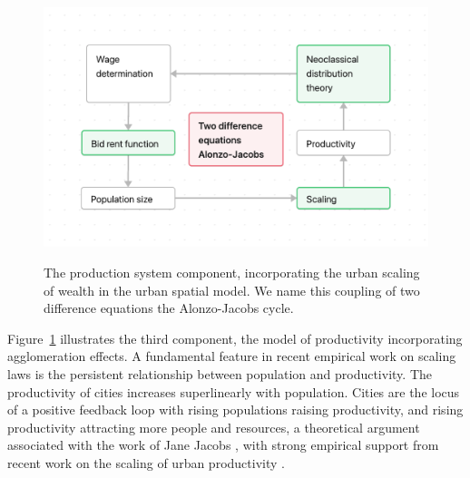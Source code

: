 \begin{figure}[!ht]
    \centering
    \includegraphics[scale=.7]{fig/flow_alonzo-jacobs_cycle.png}
    \label{fig-alonzo-jacobs-cycle}
\caption[Production system.]{The production system component, incorporating the urban scaling of wealth in the urban spatial model. We name this coupling of two difference equations the Alonzo-Jacobs cycle.}
\end{figure}

Figure~\ref{fig-alonzo-jacobs-cycle} illustrates the third component, the model of productivity incorporating agglomeration effects. A fundamental feature in recent empirical work on scaling laws is the persistent relationship between population and productivity. The productivity of cities increases superlinearly with population. Cities are the locus of a positive feedback loop with rising populations raising productivity, and rising productivity attracting more people and resources, a theoretical argument associated with the work of Jane Jacobs \cite{jacobsEconomyCities1969}, with strong empirical support from recent work on the scaling of urban productivity  \cite{bettencourtGrowthInnovationScaling2007, bettencourtOriginsScalingCities2013, dongUnderstandingMesoscopicScaling2020, loboUrbanScalingProduction2013}.

